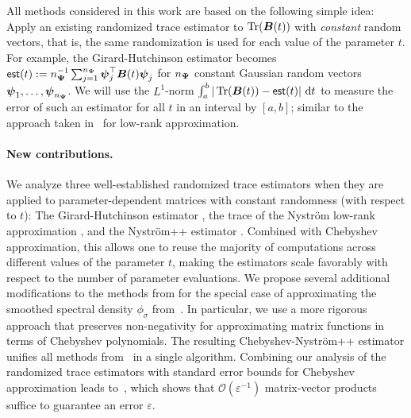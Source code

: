 All methods considered in this work are based on the following simple idea: Apply an existing randomized trace estimator to $\operatorname{Tr}(\boldsymbol{B}(t))$ with \emph{constant} random vectors, that is, the same randomization is used for each value of the parameter $t$. For example, the Girard-Hutchinson estimator becomes $\mathsf{est}(t):=n_{\boldsymbol{\Psi}}^{-1} \sum_{j=1}^{n_{\boldsymbol{\Psi}}} \boldsymbol{\psi}_j^{\top} \boldsymbol{B}(t) \boldsymbol{\psi}_j$ for $n_{\boldsymbol{\Psi}}$ constant Gaussian random vectors $\boldsymbol{\psi}_1, \dots, \boldsymbol{\psi}_{n_{\boldsymbol{\Psi}}}$. We will use the $L^1$-norm $\int_{a}^{b} | \operatorname{Tr}(\boldsymbol{B}(t)) - \mathsf{est}(t) |~\mathrm{d}t$ to measure the error of such an estimator for all $t$ in an interval by $[a,b]$; similar to the approach taken in~\cite{kressner-2024-randomized-lowrank} for low-rank approximation.

\paragraph{New contributions.} We analyze three well-established randomized trace estimators when they are applied to parameter-dependent matrices with constant randomness (with respect to $t$): The Girard-Hutchinson estimator \cite{girard-1989-fast-montecarlo, hutchinson-1990-stochastic-estimator}, the trace of the Nyström low-rank approximation \cite{gittens-2013-revisiting-nystrom}, and the Nyström++ estimator \cite{persson-2022-improved-variants}. Combined with Chebyshev approximation, this allows one to reuse the majority of computations across different values of the parameter $t$, making the estimators scale favorably with respect to the number of parameter evaluations. We propose several additional modifications to the methods from \cite{lin-2017-randomized-estimation} for the special case of approximating the smoothed spectral density $\phi_{\sigma}$ from~. In particular, we use a more rigorous approach that preserves non-negativity for approximating matrix functions in terms of Chebyshev polynomials. The resulting Chebyshev-Nyström++ estimator 
unifies all methods from~\cite{lin-2017-randomized-estimation} in a single algorithm. %
Combining our analysis of the randomized trace estimators with standard error bounds for Chebyshev approximation leads to~, which shows that $\mathcal O(\varepsilon^{-1})$ matrix-vector products suffice to guarantee an error $\varepsilon$.

